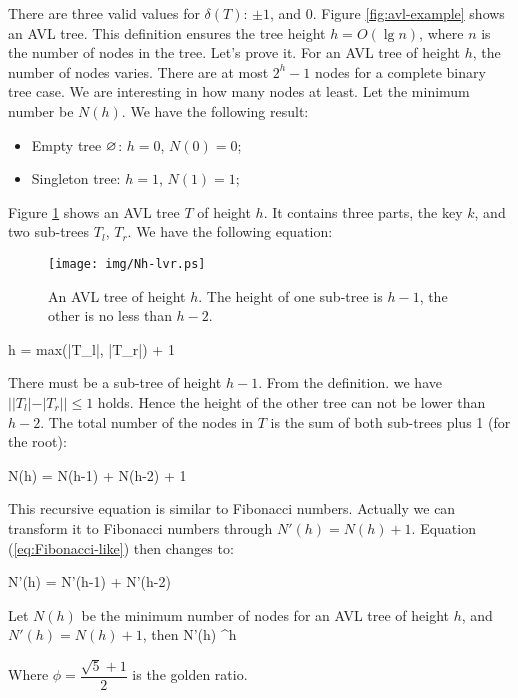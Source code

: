\documentclass[b5paper]{article}
\begin{document}
There are three valid values for $\delta(T)$: $\pm 1$, and 0. Figure \ref{fig:avl-example} shows an AVL tree. This definition ensures the tree height $h = O(\lg n)$, where $n$ is the number of nodes in the tree. Let's prove it. For an AVL tree of height $h$, the number of nodes varies. There are at most $2^h - 1$ nodes for a complete binary tree case. We are interesting in how many nodes at least. Let the minimum number be $N(h)$. We have the following result:

\begin{itemize}
\item Empty tree $\varnothing$: $h = 0$, $N(0) = 0$;
\item Singleton tree: $h = 1$, $N(1) = 1$;
\end{itemize}

Figure \ref{fig:N-h-relation} shows an AVL tree $T$ of height $h$. It contains three parts, the key $k$, and two sub-trees $T_l$, $T_r$. We have the following equation:

\begin{figure}[htbp]
   \centering
   \texttt{[image: img/Nh-lvr.ps]}
   \caption{An AVL tree of height $h$. The height of one sub-tree is $h-1$, the other is no less than $h-2$.}
   \label{fig:N-h-relation}
\end{figure}

\be
  h = max(|T_l|, |T_r|) + 1
\ee

There must be a sub-tree of height $h - 1$. From the definition. we have $||T_l|-|T_r|| \leq 1$ holds. Hence the height of the other tree can not be lower than $h - 2$. The total number of the nodes in $T$ is the sum of both sub-trees plus 1 (for the root):

\be
  N(h) = N(h-1) + N(h-2) + 1
  \label{eq:Fibonacci-like}
\ee

This recursive equation is similar to Fibonacci numbers. Actually we can transform it to Fibonacci numbers through $N'(h) = N(h) + 1$. Equation (\ref{eq:Fibonacci-like}) then changes to:

\be
  N'(h) = N'(h-1) + N'(h-2)
\ee

\begin{lemma}
\label{lemma:N-phi}
Let $N(h)$ be the minimum number of nodes for an AVL tree of height $h$, and $N'(h) = N(h) + 1$, then
\be
  N'(h) \geq \phi^h
\ee

Where $\phi = \dfrac{\sqrt{5}+1}{2}$ is the golden ratio.
\end{lemma}
\end{document}

